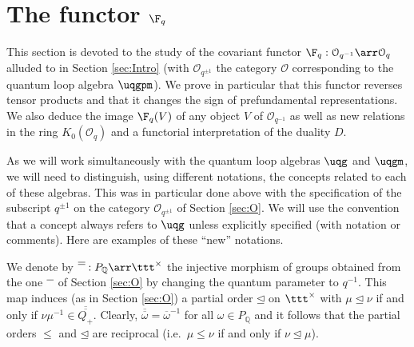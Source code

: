 \documentclass[11pt]{amsart}
\theoremstyle{definition}
\theoremstyle{remark}
\numberwithin{equation}{section}
\begin{document}
\section{The functor $\F_q$}\label{sec:Fq}
This section is devoted to the study of the covariant functor $\F_q:\mathcal{O}_{q^{-1}}\arr \mathcal{O}_{q}$ alluded to in Section \ref{sec:Intro} (with $\mathcal{O}_{q^{\pm 1}}$ the category $\mathcal{O}$ corresponding to the quantum loop algebra $\uqgpm$). We prove in particular that this functor reverses tensor products and that it changes the sign of prefundamental representations. We also
 deduce the image $\F_q(V)$ of any object $V$ of $\mathcal{O}_{q^{-1}}$ as well as new relations in the ring $K_0(\mathcal{O}_q)$ and a functorial interpretation of the %
duality $D$. \par
As we will work simultaneously with the quantum loop algebras $\uqg$ and $\uqgm$, we will need to distinguish, using different notations, the concepts related to each of these algebras. This was in particular done above with the specification of the subscript $q^{\pm 1}$ on the category $\mathcal{O}_{q^{\pm 1}}$ of Section \ref{sec:O}. We will use the convention that a concept always refers to $\uqg$ unless explicitly specified (with notation or comments). Here are examples of these  ``new'' notations. \par We denote by $\overline{\overline{\textcolor{white}{\alpha}}} : P_{\mathbb{Q}}\arr \ttt^{\times}$ the injective morphism of groups obtained from the one $\overline{\textcolor{white}{\alpha}}$ of Section \ref{sec:O} by changing the quantum parameter to $q^{-1}$. This map induces (as in Section \ref{sec:O}) a partial order $\unlhd$ on $\ttt^{\times}$ with $\mu\unlhd \nu$ if and only if $\nu\mu^{-1}\in \overline{\overline{Q_+}}$. Clearly, $\overline{\overline{\omega}}=\overline{\omega}^{-1}$ for all $\omega \in P_{\mathbb{Q}}$ and it follows that the partial orders $\leq$ and $\unlhd$ are reciprocal (i.e.~$\mu\leq \nu$ if and only if $\nu\unlhd \mu$).
\end{document}
